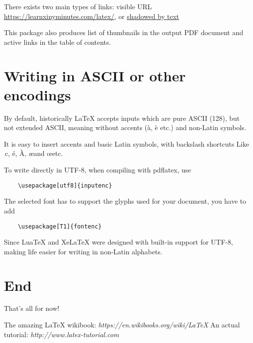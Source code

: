 \documentclass[12pt]{article}
\begin{document}
There exists two main types of links: visible URL \\
\url{https://learnxinyminutes.com/latex/}, or
\href{https://learnxinyminutes.com/latex/}{shadowed by text}

This package also produces list of thumbnails in the output PDF document and
active links in the table of contents.

\section{Writing in ASCII or other encodings}

By default, historically LaTeX accepts inputs which are pure ASCII (128),
but not extended ASCII, meaning without accents (à, è etc.) and non-Latin symbols.

It is easy to insert accents and basic Latin symbols, with backslash shortcuts
Like \,c, \'e, \`A, \ae and \oe etc.  %

To write directly in UTF-8, when compiling with pdflatex, use
\begin{verbatim}
    \usepackage[utf8]{inputenc}
\end{verbatim}
The selected font has to support the glyphs used for your document, you have to add
\begin{verbatim}
    \usepackage[T1]{fontenc}
\end{verbatim}

Since LuaTeX and XeLaTeX were designed with built-in support for UTF-8, making
life easier for writing in non-Latin alphabets.

\section{End}

That's all for now!

\begin{thebibliography}{1}
   The amazing \LaTeX{} wikibook: \emph{https://en.wikibooks.org/wiki/LaTeX}
   An actual tutorial: \emph{http://www.latex-tutorial.com}
\end{thebibliography}

\end{document}

